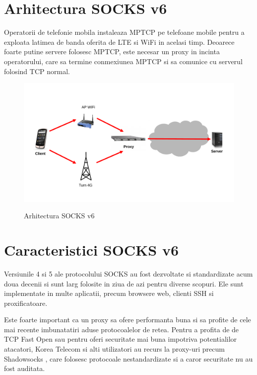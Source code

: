 \chapter{Arhitectura SOCKS v6}
\label{sec:arch_upb}


Operatorii de telefonie mobila instaleaza MPTCP \cite{Raiciu_Hard:2012} pe telefoane mobile 
pentru a exploata latimea de banda oferita de LTE si WiFi in acelasi timp. Deoarece foarte putine
servere folosesc MPTCP, este necesar un proxy in incinta operatorului, care sa termine conmexiunea
MPTCP si sa comunice cu serverul folosind TCP normal.

\begin{figure}[t]
	\centering
	\includegraphics*[angle=0,width=\textwidth]{figures/socks/arch}
	\label{fig:arch}
	\caption{Arhitectura SOCKS v6}
\end{figure}



\chapter{Caracteristici SOCKS v6}
\label{sec:arch_upb}

Versiunile 4 si 5 \cite{rfc1928} ale protocolului SOCKS au fost dezvoltate si standardizate acum
doua decenii si sunt larg folosite in ziua de azi pentru diverse scopuri.
Ele sunt implementate in multe aplicatii, precum browsere web, clienti SSH si proxificatoare.

Este foarte important ca un proxy sa ofere performanta buna si sa profite de cele mai recente
imbunatatiri aduse protocoalelor de retea. Pentru a profita de de TCP Fast Open \cite{rfc7413}
sau pentru oferi securitate mai buna impotriva potentialilor atacatori, Korea Telecom si alti utilizatori
au recurs la proxy-uri precum Shadowsocks \cite{shadowsocks}, care folosesc protocoale nestandardizate
si a caror securitate nu au fost auditata.

